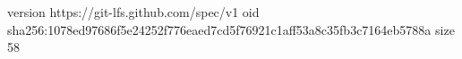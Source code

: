 version https://git-lfs.github.com/spec/v1
oid sha256:1078ed97686f5e24252f776eaed7cd5f76921c1aff53a8c35fb3c7164eb5788a
size 58
